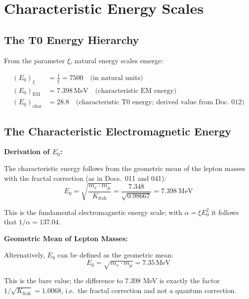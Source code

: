 	\section{Characteristic Energy Scales}
	
	\subsection{The T0 Energy Hierarchy}
	
	From the parameter $\xi$, natural energy scales emerge:
	
	\begin{align}
		(E_0)_{\xi} &= \frac{1}{\xi} = 7500 \quad \text{(in natural units)} \\
		(E_0)_{\text{EM}} &= 7.398\,\mathrm{MeV} \quad \text{(characteristic EM energy)} \\
		(E_0)_{\text{char}} &= 28.8 \quad \text{(characteristic T0 energy; derived value from Doc.~012)}
	\end{align}
	
	\subsection{The Characteristic Electromagnetic Energy}
	
	\begin{keyresult}
		\textbf{Derivation of $E_0$:}
		
		The characteristic energy follows from the geometric mean of the lepton masses with the fractal correction (as in Docs.~011 and 041):
		\begin{equation}
			E_0 = \sqrt{\frac{m_e \cdot m_\mu}{K_{\text{frak}}}} = \frac{7.348}{\sqrt{0.98667}} = 7.398\ \text{MeV}
		\end{equation}

		This is the fundamental electromagnetic energy scale; with $\alpha = \xi E_0^2$ it follows that $1/\alpha = 137.04$.
	\end{keyresult}
	
	\begin{alternative}
		\textbf{Geometric Mean of Lepton Masses:}
		
		Alternatively, $E_0$ can be defined as the geometric mean:
		\begin{equation}
			E_0 = \sqrt{m_e \cdot m_\mu} = 7.35\,\mathrm{MeV}
		\end{equation}
		
		This is the bare value; the difference to 7.398 MeV is exactly the factor $1/\sqrt{K_{\text{frak}}} = 1.0068$, i.e.\ the fractal correction and not a quantum correction.
	\end{alternative}
	
